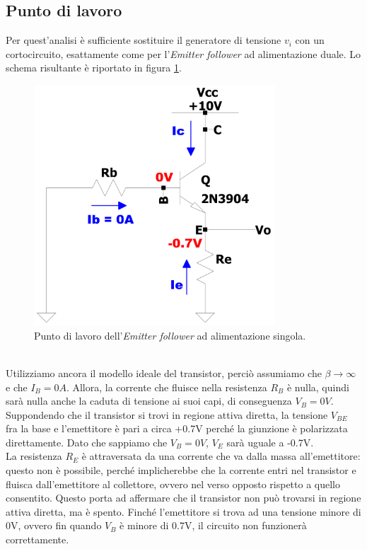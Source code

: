 \documentclass{report}
\begin{document}
\subsection{Punto di lavoro} %
Per quest'analisi è sufficiente sostituire il generatore di tensione $v_i$ con un cortocircuito, esattamente come per l'\textit{Emitter follower} ad alimentazione duale. Lo schema risultante è riportato in figura \ref{figura:EFv2_1_pl}.
\begin{figure}[h]
\centering
\includegraphics[height=9cm]{immagini/EFv2_1_pl}
\caption{Punto di lavoro dell'\textit{Emitter follower} ad alimentazione singola.}
\label{figura:EFv2_1_pl}
\end{figure}
\\Utilizziamo ancora il modello ideale del transistor, perciò assumiamo che $\displaystyle{\beta\rightarrow\infty}$ e che $I_{B}=0A$. Allora, la corrente che fluisce nella resistenza  $R_B$ è nulla, quindi sarà nulla anche la caduta di tensione ai suoi capi, di conseguenza $V_B=0V$.
\\\indent Suppondendo che il transistor si trovi in regione attiva diretta, la tensione $V_{BE}$ fra la base e l'emettitore è pari a circa +0.7V perché la giunzione è polarizzata direttamente. Dato che sappiamo che $V_{B}=0V$, $V_{E}$ sarà uguale a -0.7V. 
\\\indent La resistenza $R_E$ è attraversata da una corrente che va dalla massa all'emettitore: questo non è possibile, perché implicherebbe che la corrente entri nel transistor e fluisca dall'emettitore al collettore, ovvero nel verso opposto rispetto a quello consentito. Questo porta ad affermare che il transistor non può trovarsi in regione attiva diretta, ma è spento. Finché l'emettitore si trova ad una tensione minore di 0V, ovvero fin quando $V_B$ è minore di 0.7V, il circuito non funzionerà correttamente.
\end{document}
